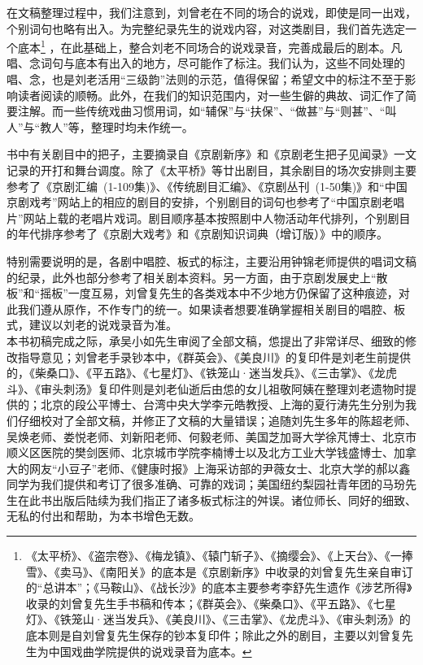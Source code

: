 在文稿整理过程中，我们注意到，刘曾老在不同的场合的说戏，即使是同一出戏，个别词句也略有出入。为完整纪录先生的说戏内容，对这类剧目，我们首先选定一个底本\footnote{《太平桥》、《盗宗卷》、《梅龙镇》、《辕门斩子》、《摘缨会》、《上天台》、《一捧雪》、《卖马》、《南阳关》的底本是《京剧新序》中收录的刘曾复先生亲自审订的``总讲本''；《马鞍山》、《战长沙》的底本主要参考李舒先生遗作《涉艺所得》收录的刘曾复先生手书稿和传本；《群英会》、\textrm{《柴桑口》、《平五路》、《七星灯》、《铁笼山·迷当发兵》、《美良川》、《三击掌》、《龙虎斗》、《审头刺汤》的底本则是自刘曾复先生保存的钞本复印件；除此之外的剧目，主要}以刘曾复先生为中国戏曲学院提供的说戏录音为底本。%
}%
，在此基础上，整合刘老不同场合的说戏录音，完善成最后的剧本。凡唱、念词句与底本有出入的地方，尽可能作了标注。我们认为，这些不同处理的唱、念，也是刘老活用``三级韵''法则的示范，值得保留；希望文中的标注不至于影响读者阅读的顺畅。此外，在我们的知识范围内，对一些生僻的典故、词汇作了简要注解。而一些传统戏曲习惯用词，如``辅保''与``扶保''、``做甚''与``则甚''、``叫人''与``教人''等，整理时均未作统一。

书中有关剧目中的把子，主要摘录自《京剧新序》和《京剧老生把子见闻录》一文记录的开打和舞台调度。\textrm{除了《太平桥》等廿出剧目，其余剧目的场次安排则主要参考了《京剧汇编~(1-109集)》、《传统剧目汇编》、《京剧丛刊~(1-50集)》和``中国京剧戏考''网站上的相应的剧目的安排，个别剧目的词句也参考了``中国京剧老唱片''网站上载的老唱片戏词。剧目顺序基本按照剧中人物活动年代排列，个别剧目的年代排序参考了《京剧大戏考》}和《京剧知识词典（增订版）》\textrm{中的顺序。}

特别需要说明的是，各剧中唱腔、板式的标注，主要沿用钟锦老师提供的唱词文稿的纪录，此外也部分参考了相关剧本资料。另一方面，由于京剧发展史上``散板''和``摇板''一度互易，刘曾复先生的各类戏本中不少地方仍保留了这种痕迹，对此我们遵从原作，不作专门的统一。如果读者想要准确掌握相关剧目的唱腔、板式，建议以刘老的说戏录音为准。\\


本书初稿完成之际，承吴小如先生审阅了全部文稿，怹提出了非常详尽、细致的修改指导意见；刘曾老手录钞本中，《群英会》、《美良川》的复印件是刘老生前提供的，\textrm{《柴桑口》、《平五路》、《七星灯》、《铁笼山·迷当发兵》、《三击掌》、《龙虎斗》、《审头刺汤》}复印件则是刘老仙逝后由怹的女儿\textrm{祖敬阿姨在整理刘老遗物时提供的；北京的}段公平博士、\textrm{台湾中央大学}李元皓教授、上海的夏行涛先生分别为我们仔细校对了全部文稿，并修正了文稿的大量错误；\textrm{追随刘先生多年的}陈超老师、吴焕老师、娄悦老师、刘新阳老师、\textrm{何毅老师、美国芝加哥大学徐芃博士、北京市顺义区医院的樊剑医师、北京城市学院李楠博士以及北方工业大学钱盛博士、加拿大的网友``小豆子''老师、《健康时报》上海采访部的尹薇女士、北京大学的郝以鑫同学为我们提供和考订了很多准确、可靠的戏词；美国纽约梨园社青年团的马玢先生在此书出版后陆续为我们指正了诸多板式标注的舛误。诸位师长、同好的细致、无私的付出和帮助，为本书增色无数。}

